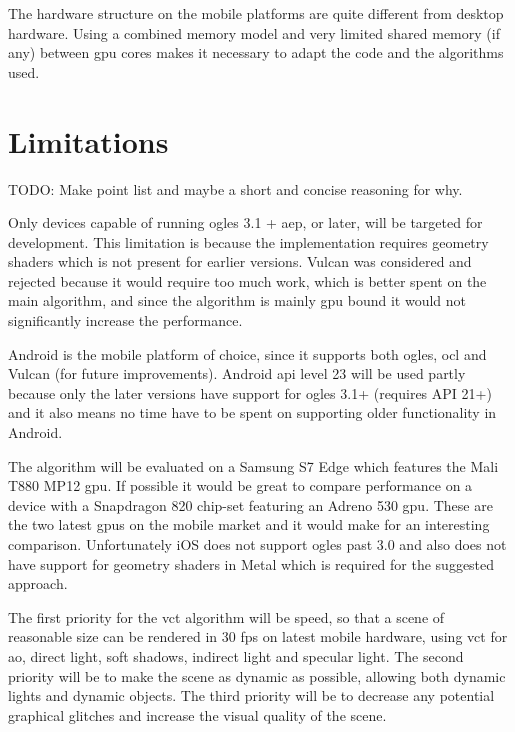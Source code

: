 The hardware structure on the mobile platforms are quite different from desktop hardware. 
Using a combined memory model and very limited shared memory (if any) between \gls{gpu} cores makes it necessary to adapt the code and the algorithms used.

\section{Limitations}

TODO: Make point list and maybe a short and concise reasoning for why.

Only devices capable of running \gls{ogles} 3.1 + \gls{aep}, or later, will be targeted for development. This limitation is because the implementation requires geometry shaders which is not present for earlier versions. 
Vulcan was considered and rejected because it would require too much work, which is better spent on the main algorithm, and since the algorithm is mainly \gls{gpu} bound it would not significantly increase the performance.

Android is the mobile platform of choice, since it supports both \gls{ogles}, \gls{ocl} and Vulcan (for future improvements). 
Android \acrshort{api} level 23 will be used partly because only the later versions have support for \gls{ogles} 3.1+ (requires API 21+) and it also means no time have to be spent on supporting older functionality in Android.

The algorithm will be evaluated on a Samsung S7 Edge which features the Mali T880 MP12 \gls{gpu}. 
If possible it would be great to compare performance on a device with a Snapdragon 820 chip-set featuring an Adreno 530 \gls{gpu}. These are the two latest \glspl{gpu} on the mobile market and it would make for an interesting comparison. 
Unfortunately iOS does not support \gls{ogles} past 3.0 and also does not have support for geometry shaders in Metal which is required for the suggested approach.

The first priority for the \gls{vct} algorithm will be speed, so that a scene of reasonable size can be rendered in 30 fps on latest mobile hardware, using \gls{vct} for \gls{ao}, direct light, soft shadows, indirect light and specular light. 
The second priority will be to make the scene as dynamic as possible, allowing both dynamic lights and dynamic objects. 
The third priority will be to decrease any potential graphical glitches and increase the visual quality of the scene. 